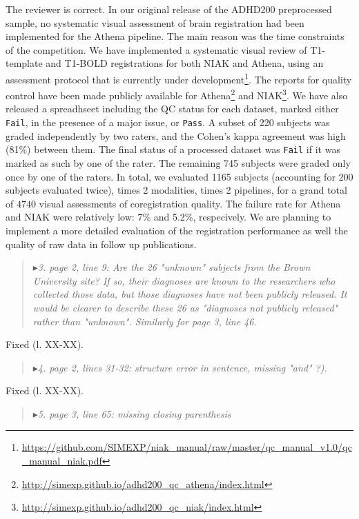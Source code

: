 \documentclass[authoryear,3p]{elsarticle}
\begin{document}
The reviewer is correct. In our original release of the ADHD200 preprocessed sample, no systematic visual assessment of brain registration had been implemented for the Athena pipeline. The main reason was the time constraints of the competition. We have implemented a systematic visual review of T1-template and T1-BOLD registrations for both NIAK and Athena, using an assessment protocol that is currently under development\footnote{\url{https://github.com/SIMEXP/niak_manual/raw/master/qc_manual_v1.0/qc_manual_niak.pdf}}. The reports for quality control have been made publicly available for Athena\footnote{\url{http://simexp.github.io/adhd200_qc_athena/index.html}} and NIAK\footnote{\url{http://simexp.github.io/adhd200_qc_niak/index.html}}. We have also released a spreadhseet including the QC status for each dataset, marked either \texttt{Fail}, in the presence of a major issue, or \texttt{Pass}. A subset of 220 subjects was graded independently by two raters, and the Cohen's kappa agreement was high (81\%) between them. The final status of a processed dataset was \texttt{Fail} if it was marked as such by one of the rater. The remaining 745 subjects were graded only once by one of the raters. In total, we evaluated 1165 subjects (accounting for 200 subjects evaluated twice), times 2 modalities, times 2 pipelines, for a grand total of $4740$ visual assessments of coregistration quality. The failure rate for Athena and NIAK were relatively low: 7\% and 5.2\%, respecively. We are planning to implement a more detailed evaluation of the registration performance as well the quality of raw data in follow up publications. 

\begin{quote}
$\blacktriangleright$\emph{3. page 2, line 9: Are the 26 "unknown" subjects from the Brown University site? If so, their diagnoses are known to the researchers who collected those data, but those diagnoses have not been publicly released. It would be clearer to describe these 26 as "diagnoses not publicly released" rather than "unknown". Similarly for page 3, line 46.}
\end{quote}

Fixed (l. XX-XX). 

\begin{quote}
$\blacktriangleright$\emph{4. page 2, lines 31-32: structure error in sentence, missing "and" ?). 
}
\end{quote}

Fixed (l. XX-XX).

\begin{quote}
$\blacktriangleright$\emph{5. page 3, line 65: missing closing parenthesis}
\end{quote}
\end{document}
